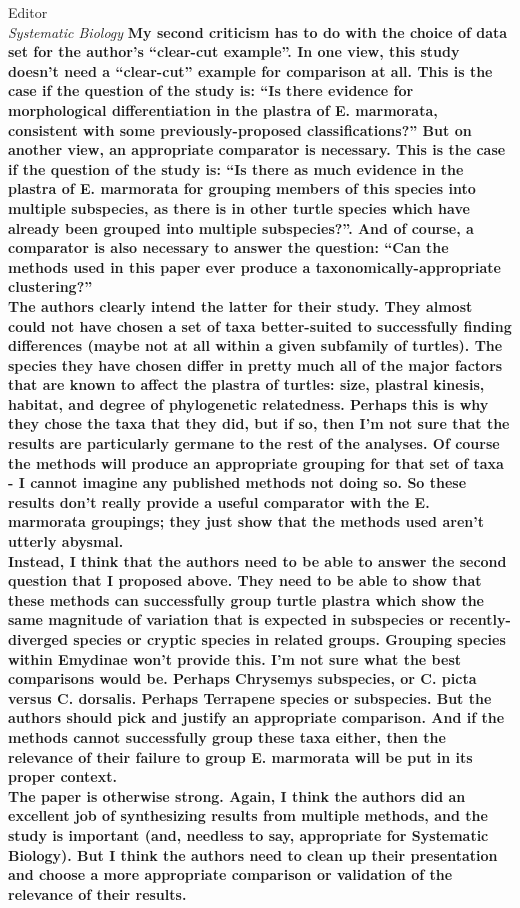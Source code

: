 \documentclass{letter}
\begin{document}
\begin{letter}{Editor \\ \textit{Systematic Biology}}
  \textbf{My second criticism has to do with the choice of data set for the author’s ``clear-cut example''. In one view, this study doesn’t need a ``clear-cut'' example for comparison at all. This is the case if the question of the study is: ``Is there evidence for morphological differentiation in the plastra of E. marmorata, consistent with some previously-proposed classifications?'' But on another view, an appropriate comparator is necessary. This is the case if the question of the study is: ``Is there as much evidence in the plastra of E. marmorata for grouping members of this species into multiple subspecies, as there is in other turtle species which have already been grouped into multiple subspecies?''. And of course, a comparator is also necessary to answer the question: ``Can the methods used in this paper ever produce a taxonomically-appropriate clustering?''\\
    The authors clearly intend the latter for their study. They almost could not have chosen a set of taxa better-suited to successfully finding differences (maybe not at all within a given subfamily of turtles). The species they have chosen differ in pretty much all of the major factors that are known to affect the plastra of turtles: size, plastral kinesis, habitat, and degree of phylogenetic relatedness. Perhaps this is why they chose the taxa that they did, but if so, then I’m not sure that the results are particularly germane to the rest of the analyses. Of course the methods will produce an appropriate grouping for that set of taxa - I cannot imagine any published methods not doing so. So these results don’t really provide a useful comparator with the E. marmorata groupings; they just show that the methods used aren’t utterly abysmal. \\
    Instead, I think that the authors need to be able to answer the second question that I proposed above. They need to be able to show that these methods can successfully group turtle plastra which show the same magnitude of variation that is expected in subspecies or recently-diverged species or cryptic species in related groups. Grouping species within Emydinae won’t provide this. I’m not sure what the best comparisons would be. Perhaps Chrysemys subspecies, or C. picta versus C. dorsalis. Perhaps Terrapene species or subspecies. But the authors should pick and justify an appropriate comparison. And if the methods cannot successfully group these taxa either, then the relevance of their failure to group E. marmorata will be put in its proper context. \\
  The paper is otherwise strong. Again, I think the authors did an excellent job of synthesizing results from multiple methods, and the study is important (and, needless to say, appropriate for Systematic Biology). But I think the authors need to clean up their presentation and choose a more appropriate comparison or validation of the relevance of their results. }


\end{letter}
\end{document}

